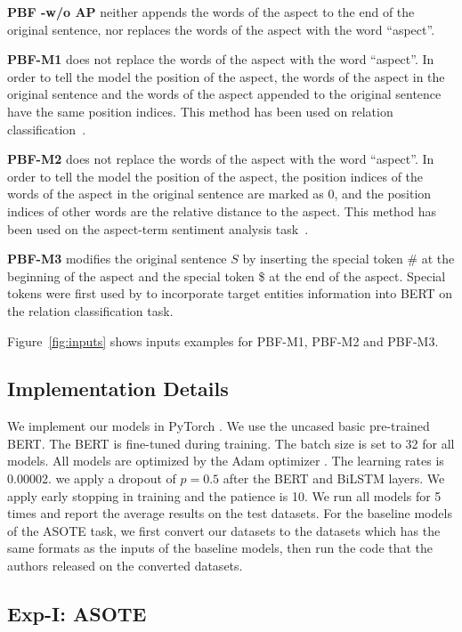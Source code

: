\documentclass[11pt]{article}
\begin{document}
\textbf{PBF -w/o AP} neither appends the words of the aspect to the end of the original sentence, nor replaces the words of the aspect with the word ``aspect''.

\textbf{PBF-M1} does not replace the words of the aspect with the word ``aspect''. In order to tell the model the position of the aspect, the words of the aspect in the original sentence and the words of the aspect appended to the original sentence have the same position indices. This method has been used on relation classification~\citep{zhong2020frustratingly}.

\textbf{PBF-M2} does not replace the words of the aspect with the word ``aspect''. In order to tell the model the position of the aspect, the position indices of the words of the aspect in the original sentence are marked as 0, and the position indices of other words are the relative distance to the aspect. This method has been used on the aspect-term sentiment analysis task~\citep{gu-etal-2018-position}.

\textbf{PBF-M3} modifies the original sentence $S$ by inserting the special token \# at the beginning of the aspect and the special token \$ at the end of the aspect. Special tokens were first used by \citet{wu2019enriching} to incorporate target entities information into BERT on the relation classification task. 

Figure~\ref{fig:inputs} shows inputs examples for  PBF-M1, PBF-M2 and PBF-M3.

\subsection{Implementation Details}
We implement our models in PyTorch \citep{paszke2017automatic}. We use the uncased basic pre-trained BERT. The BERT is fine-tuned during training. The batch size is set to 32 for all models. All models are optimized by the Adam optimizer \citep{kingma2014adam}. The learning rates is 0.00002. we apply a dropout of $p= 0.5$ after the BERT and BiLSTM layers. We apply early stopping in training and the patience is 10. We run all models for 5 times and report the average results on the test datasets. For the baseline models of the ASOTE task, we first convert our datasets to the datasets which has the same formats as the inputs of the baseline models, then run the code that the authors released on the converted datasets. 

\subsection{Exp-I: ASOTE}
\end{document}

